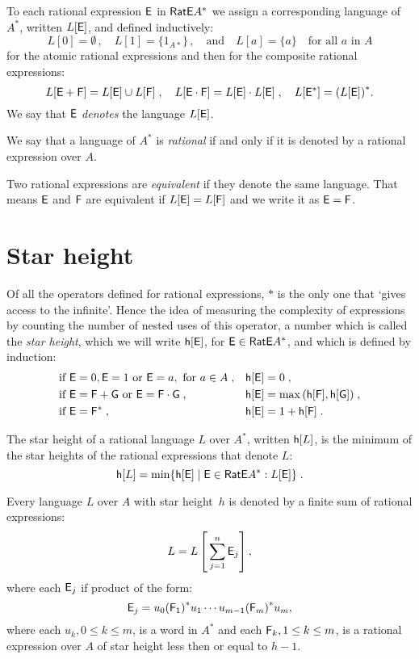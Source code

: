 \begin{defn}
    To each rational expression ${\mathsf{E}}$ in ${\mathsf{RatE}} A^*$ we assign a corresponding language of $A^*$, written $L[{\mathsf{E}}]$, and defined inductively:
    \[
            L[0] = \emptyset \, , \quad L[1] = \{1_{A*}\} \, , \quad \text{and} \quad L[a] = \{a\} \quad \text{for all $a$ in $A$}
    \]
    for the atomic rational expressions and then for the composite rational expressions:
    \[
        L[{\mathsf{E}} + {\mathsf{F}}] = L[{\mathsf{E}}] \cup L[{\mathsf{F}}] \; , \quad L[{\mathsf{E}} \cdot {\mathsf{F}}] = L[{\mathsf{E}}] \cdot L[{\mathsf{E}}] \; , \quad L[{\mathsf{E}}^*] = {(L[{\mathsf{E}}])}^*.
    \]
    We say that ${\mathsf{E}}$ \emph{denotes} the language $L[{\mathsf{E}}]$.
\end{defn}

We say that a language of $A^*$ is \emph{rational} if and only if it is denoted by a rational expression over $A$.

Two rational expressions are \emph{equivalent} if they denote the same language. That means ${\mathsf{E}}$ and ${\mathsf{F}}$ are equivalent if $L[{\mathsf{E}}] = L[{\mathsf{F}}]$ and we write it as ${\mathsf{E}} = {\mathsf{F}}$.

\section{Star height}

Of all the operators defined for rational expressions, $*$ is the only one that `gives access to the infinite'. Hence the idea of measuring the complexity of expressions by counting the number of nested uses of this operator, a number which is called the \emph{star height}, which we will write ${\mathsf{h}[{\mathsf{E}}]}$, for ${\mathsf{E}} \in {\mathsf{RatE}} A^*$, and which is defined by induction:
\begin{align*}
    &\text{if } {\mathsf{E}} = 0, {\mathsf{E}} = 1 \text{ or } {\mathsf{E}} = a, \text{ for } a \in A \; , & &{\mathsf{h}[{\mathsf{E}}]} = 0 \; , \\
    &\text{if } {\mathsf{E}} = {\mathsf{F}} + {\mathsf{G}} \text{ or } {\mathsf{E}} = {\mathsf{F}} \cdot {\mathsf{G}}\; , & &{\mathsf{h}[{\mathsf{E}}]} = \max{({\mathsf{h}[{\mathsf{F}}]}, {\mathsf{h}[{\mathsf{G}}]})} \; , \\
    &\text{if } {\mathsf{E}} = {\mathsf{F}}^* \; , & &{\mathsf{h}[{\mathsf{E}}]} = 1 + {\mathsf{h}[{\mathsf{F}}]} \; .
\end{align*}

The star height of a rational language $L$ over $A^*$, written ${\mathsf{h}[L]}$, is the minimum of the star heights of the rational expressions that denote $L$:
\[
    {\mathsf{h}[L]} = \min \{ {\mathsf{h}[{\mathsf{E}}]} \mid {\mathsf{E}} \in {\mathsf{RatE}} A^*: L[{\mathsf{E}}] \} \; .
\]

\begin{lemma}\label{lm:star_height_distributivity}
    Every language $L$ over $A$ with star height~$h$ is denoted by a finite sum of rational expressions:
    \[
        L = L \left[ \, \sum_{j=1}^n {\mathsf{E}}_j \right] ,
    \]
    where each ${\mathsf{E}}_j$ if product of the form:
    \[
        {\mathsf{E}}_j = u_0{({\mathsf{F}}_1)}^*u_1 \dotsm u_{m-1}{({\mathsf{F}}_m)}^*u_m,
    \]
    where each $u_k, 0 \leq k \leq m$, is a word in $A^*$ and each ${\mathsf{F}}_k, 1 \leq k \leq m$, is a rational expression over $A$ of star height less then or equal to $h-1$.
\end{lemma}

